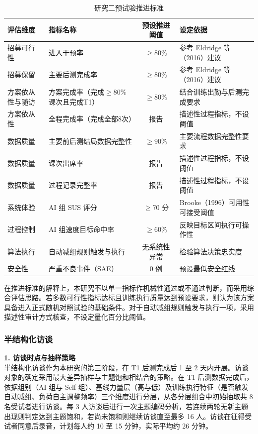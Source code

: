 \documentclass[UTF8,zihao=-4,twoside,openany]{ctexbook}
\begin{document}
\begin{table}[htbp]
  \centering
  \caption{研究二预试验推进标准}
  \label{tab:ch3-progression}
  \vspace{6pt}
  \small
  \begin{tabularx}{\textwidth}{|m{2.8cm}|m{4.2cm}|c|X|}
    \hline
    \textbf{评估维度} & \textbf{指标名称} & \textbf{预设推进阈值} & \textbf{设定依据} \\ \hline
    招募可行性 & 进入干预率 & $\ge 80\%$ & 参考 Eldridge 等（2016）建议 \\ \hline
    招募保留 & 主要后测完成率 & $\ge 80\%$ & 参考 Eldridge 等（2016）建议 \\ \hline
    方案依从性与随访 & 方案完成率（完成$\ge 80\%$课次且完成T1） & $\ge 80\%$ & 结合训练出勤与后测完成要求 \\ \hline
    方案依从性 & 全程完成率（完成全部8次） & 报告 & 描述性过程指标，不设阈值 \\ \hline
    数据质量 & 主要前后测结局数据完整性 & $\ge 90\%$ & 主要流程数据完整性要求 \\ \hline
    数据质量 & 课次出席率 & 报告 & 描述性过程指标，不设阈值 \\ \hline
    数据质量 & 过程记录完整率 & 报告 & 描述性过程指标，不设阈值 \\ \hline
    系统体验 & AI 组 SUS 评分 & $\ge 70$ 分 & Brooke（1996）可用性可接受阈值 \\ \hline
    过程控制 & AI 组速度目标命中率 & $\ge 60\%$ & 反映目标区间执行可操作性 \\ \hline
    算法执行 & 自动减组规则触发与执行 & 无系统性异常 & 检验算法决策忠实度 \\ \hline
    安全性 & 严重不良事件（SAE） & 0 例 & 预设最低安全红线 \\ \hline
  \end{tabularx}
\end{table}

在推进标准的解释上，本研究不以单一指标作机械性通过或不通过判断，而采用综合评估思路。若多数可行性指标达标且训练执行质量达到预设要求，则认为该方案具备进入正式随机对照试验的基础条件。对于自动减组规则触发与执行一项，采用描述性审计方式核查，不设定量化百分比阈值。

\subsubsection{半结构化访谈}
\noindent \textbf{1. 访谈时点与抽样策略} \\
半结构化访谈作为本研究的第三阶段，在 T1 后测完成后 1 至 2 天内开展。访谈对象的确定采用最大差异抽样与主题饱和相结合的策略。在 T1 后测数据完成后，依据组别（AI 组与 Self 组）、基线力量层（高与低）及训练执行特征（是否触发自动减组、负荷自主调整频率）三个维度进行分层，从各分层组合中初始抽取共 8 名受试者进行访谈。每 3 人访谈后进行一次主题编码分析，若连续两轮无新主题出现则判定达到主题饱和，若尚未饱和则继续访谈直至最多 16 人。访谈在征得受试者同意后录音，计划每人约 10 至 15 分钟，实际平均约 26 分钟。
\end{document}
